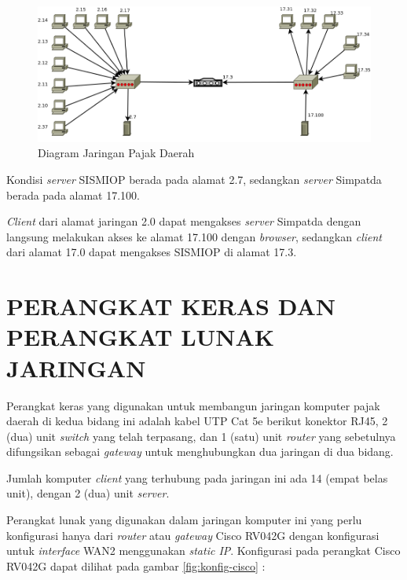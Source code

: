 \documentclass[pdftex,12pt, oneside]{article}
\begin{document}
\begin{figure}[H]
  \centering
  \includegraphics[width=1\textwidth]{./resources/dia-jaringan}
  \caption{Diagram Jaringan Pajak Daerah}
  \label{fig:dia-jaringan}
\end{figure}

Kondisi \textit{server} SISMIOP berada pada alamat 2.7, sedangkan \textit{server} Simpatda berada pada alamat 17.100.

\textit{Client} dari alamat jaringan 2.0 dapat mengakses \textit{server} Simpatda dengan langsung melakukan akses ke alamat 17.100 dengan \textit{browser}, sedangkan \textit{client} dari alamat 17.0 dapat mengakses SISMIOP di alamat 17.3.

\section{PERANGKAT KERAS DAN PERANGKAT LUNAK JARINGAN}

Perangkat keras yang digunakan untuk membangun jaringan komputer pajak daerah di kedua bidang ini adalah kabel UTP Cat 5e berikut konektor RJ45, 2 (dua) unit \textit{switch} yang telah terpasang, dan 1 (satu) unit \textit{router} yang sebetulnya difungsikan sebagai \textit{gateway} untuk menghubungkan dua jaringan di dua bidang. 

Jumlah komputer \textit{client} yang terhubung pada jaringan ini ada 14 (empat belas unit), dengan 2 (dua) unit \textit{server}.

Perangkat lunak yang digunakan dalam jaringan komputer ini yang perlu konfigurasi hanya dari \textit{router} atau \textit{gateway} Cisco RV042G dengan konfigurasi untuk \textit{interface} WAN2 menggunakan \textit{static IP}. Konfigurasi pada perangkat Cisco RV042G dapat dilihat pada gambar \ref{fig:konfig-cisco} :
\end{document}
